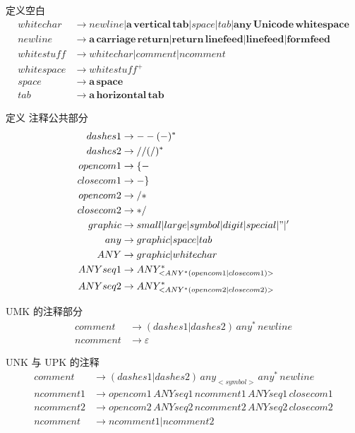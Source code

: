 \documentclass{ctexart}
\begin{document}
定义空白
\begin{align*}
whitechar &\rightarrow newline|\mathbf{a\,vertical\,tab}|space|tab|\mathbf{any\,Unicode\,whitespace} \\
newline &\rightarrow \mathbf{a\,carriage\,return}|\mathbf{return\,linefeed}|\mathbf{linefeed}|\mathbf{formfeed} \\
whitestuff &\rightarrow whitechar|comment|ncomment \\
whitespace &\rightarrow whitestuff^+ \\
space &\rightarrow \mathbf{a\,space} \\
tab &\rightarrow \mathbf{a\,horizontal\,tab}
\end{align*}

定义 注释公共部分
\begin{align*}
dashes1 &\rightarrow --(-)^* \\
dashes2 &\rightarrow //(/)^* \\
opencom1 &\rightarrow \{- \\
closecom1 &\rightarrow -\} \\
opencom2 &\rightarrow /* \\
closecom2 &\rightarrow */ \\
graphic &\rightarrow small|large|symbol|digit|special|"|' \\
any &\rightarrow graphic|space|tab \\
ANY &\rightarrow graphic|whitechar \\
ANYseq1 &\rightarrow ANY^*_{<ANY^*(opencom1|closecom1)>} \\
ANYseq2 &\rightarrow ANY^*_{<ANY^*(opencom2|closecom2)>}
\end{align*}

UMK 的注释部分
\begin{align*}
comment &\rightarrow (dashes1|dashes2)\,any^*\,newline \\
ncomment &\rightarrow \varepsilon
\end{align*}

UNK 与 UPK 的注释
\begin{align*}
comment &\rightarrow (dashes1|dashes2)\,any_{<symbol>}\,any^*\,newline \\
ncomment1 &\rightarrow opencom1\,ANYseq1\,{ncomment1\,ANYseq1}\,closecom1 \\
ncomment2 &\rightarrow opencom2\,ANYseq2\,{ncomment2\,ANYseq2}\,closecom2 \\
ncomment &\rightarrow ncomment1|ncomment2
\end{align*}
\end{document}
